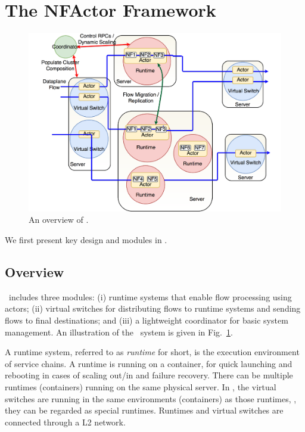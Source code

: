 \section {The NFActor Framework}

\begin{figure}[!t]
  \centering
  \includegraphics[width=\columnwidth]{figure/new-nfactor-cluster.pdf}
  \caption{An overview of \nfactor.}
  \label{fig:runtime}
\end{figure}

We first present key design and modules in \nfactor.

\subsection{Overview}
\label{sec:overview}

\nfactor~includes three modules: (i) runtime systems that enable flow processing using actors; (ii) virtual switches for distributing flows to runtime systems and sending flows to final destinations; and (iii) a lightweight coordinator for basic system management. %
 An illustration of the \nfactor~system is given in Fig.~\ref{fig:runtime}.

A runtime system, referred to as \textit{runtime} for short, is the execution environment of service chains. A runtime is running on a container, for quick launching and rebooting in cases of scaling out/in and failure recovery. There can be multiple runtimes (containers) running on the same physical server. In \nfactor, the virtual switches are running in the same environments (containers) as those runtimes, %
 \ie, they can be regarded as special runtimes. %
 Runtimes and virtual switches are connected through a L2 network.

